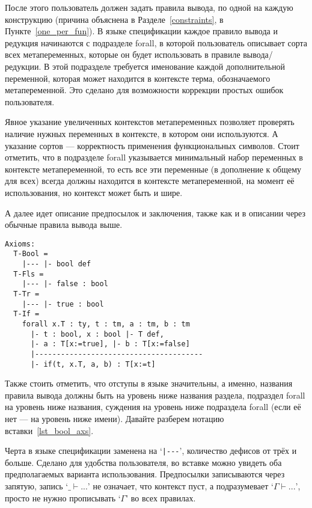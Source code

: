 После этого пользователь должен задать правила вывода, по одной на каждую конструкцию (причина объяснена в Разделе~\ref{constraints}, в Пункте~\ref{one_per_fun}). В языке спецификации каждое правило вывода и редукция начинаются с подразделе forall, в которой пользователь описывает сорта всех метапеременных, которые он будет использовать в правиле вывода/редукции. В этой подразделе требуется именование каждой дополнительной переменной, которая может находится в контексте терма, обозначаемого метапеременной. Это сделано для возможности коррекции простых ошибок пользователя.

Явное указание увеличенных контекстов метапеременных позволяет проверять наличие нужных переменных в контексте, в котором они используются. А указание сортов --- корректность применения функциональных символов. Стоит отметить, что в подразделе forall указывается минимальный набор переменных в контексте метапеременной, то есть все эти переменные (в дополнение к общему для всех) всегда должны находится в контексте метапеременной, на момент её использования, но контекст может быть и шире.

А далее идет описание предпосылок и заключения, также как и в описании через обычные правила вывода выше.

\begin{lstlisting}[label={lst_bool_axs}, caption={Правила вывода языка Bool, описанные в языке спецификации},captionpos=b, frame=single, float]
Axioms:
  T-Bool =
    |--- |- bool def
  T-Fls =
    |--- |- false : bool
  T-Tr =
    |--- |- true : bool
  T-If =
    forall x.T : ty, t : tm, a : tm, b : tm
      |- t : bool, x : bool |- T def,
      |- a : T[x:=true], |- b : T[x:=false]
      |---------------------------------------
      |- if(t, x.T, a, b) : T[x:=t]
\end{lstlisting}

Также стоить отметить, что отступы в языке значительны, а именно, названия правила вывода должны быть на уровень ниже названия раздела, подраздел forall на уровень ниже названия, суждения на уровень ниже подраздела forall (если её нет --- на уровень ниже имени). Давайте разберем нотацию вставки~\ref{lst_bool_axs}.

Черта в языке спецификации заменена на `\lstinline{|---}', количество дефисов от трёх и больше. Сделано для удобства пользователя, во вставке можно увидеть оба предполагаемых варианта использования. Предпосылки записываются через запятую, запись `$\_ \vdash ... $' не означает, что контекст пуст, а подразумевает `$\Gamma \vdash ... $', просто не нужно прописывать `$\Gamma$' во всех правилах.

